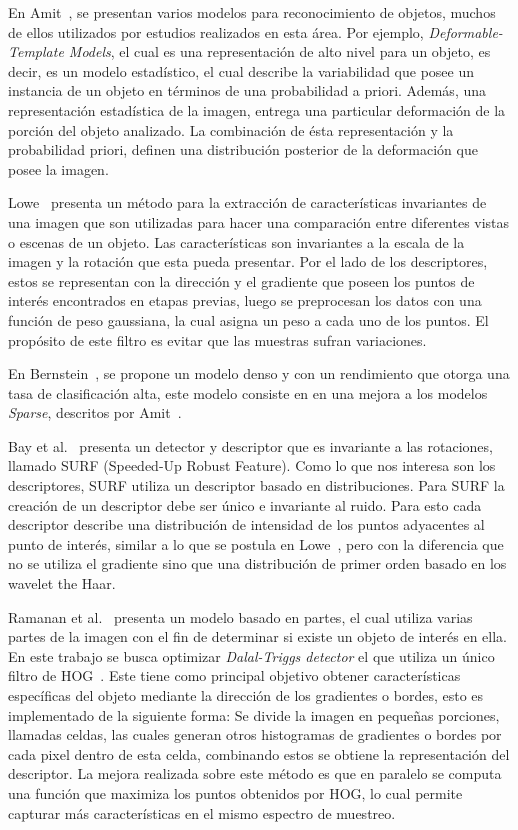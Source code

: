 En Amit~\cite{2dobject2002}, se presentan varios modelos para reconocimiento de objetos, muchos de ellos utilizados por estudios realizados en esta área. Por ejemplo, \textit{Deformable-Template Models}, el cual es una representación de alto nivel para un objeto, es decir, es un modelo estadístico, el cual describe la variabilidad que posee un instancia de un objeto en términos de una probabilidad a priori. Además, una representación  estadística de la imagen, entrega una particular deformación de la porción del objeto analizado. La combinación de ésta representación y la probabilidad priori, definen una distribución posterior de la deformación que posee la imagen.

Lowe~\cite{sift2004} presenta un método para la extracción de características invariantes de una imagen que son utilizadas para hacer una comparación entre diferentes vistas o escenas de un objeto. Las características son invariantes a la escala de la imagen y la rotación que esta pueda presentar. Por el lado de los descriptores, estos se representan con la dirección y el gradiente que poseen los puntos de interés encontrados en etapas previas, luego se preprocesan los datos con una función de peso gaussiana, la cual asigna un peso a cada uno de los puntos. El propósito de este filtro es evitar que las muestras sufran variaciones.

En Bernstein~\cite{statistical2005}, se propone un modelo denso y con un rendimiento que otorga una tasa de clasificación alta, este modelo consiste en en una mejora a los modelos \textit{Sparse}, descritos por Amit~\cite{2dobject2002}.

Bay et al.~\cite{surf2008} presenta un detector y descriptor que es invariante a las rotaciones, llamado SURF (Speeded-Up Robust Feature). Como lo que nos interesa son los descriptores, SURF utiliza un descriptor basado en distribuciones. Para SURF la creación de un descriptor debe ser único e invariante al ruido. Para esto cada descriptor describe una distribución de intensidad de los puntos adyacentes al punto de interés, similar a lo que se postula en Lowe~\cite{sift2004}, pero con la diferencia que no se utiliza el gradiente sino que una distribución de primer orden basado en los wavelet the Haar.

Ramanan et al.~\cite{oddt2010} presenta un modelo basado en partes,  el cual utiliza varias partes de la imagen con el fin de determinar si existe un objeto de interés en ella. En este trabajo se busca optimizar \textit{Dalal-Triggs detector} el que utiliza un único filtro de HOG~\cite{hog2005}. Este tiene como principal objetivo obtener características específicas del objeto mediante la dirección de los gradientes o bordes, esto es implementado de la siguiente forma: Se divide la imagen en pequeñas porciones, llamadas celdas, las cuales generan otros histogramas de gradientes o bordes por cada pixel dentro de esta celda, combinando estos se obtiene la representación del descriptor. La mejora realizada sobre este método es que en paralelo se computa una función que maximiza los puntos obtenidos por HOG, lo cual permite capturar más características en el mismo espectro de muestreo.

